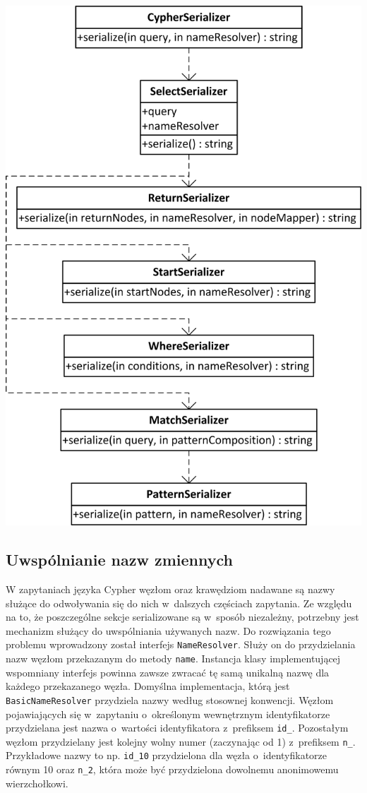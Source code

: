 \documentclass{xmgr}
\begin{document}
\newpage

\begin{center}
	\includegraphics[scale=1]{images/cypher-serialization-uml.png}
\end{center}

\subsection{Uwspólnianie nazw zmiennych}

W zapytaniach języka Cypher węzłom oraz krawędziom nadawane są nazwy służące do odwoływania się do nich w~dalszych częściach zapytania. Ze względu na to, że poszczególne sekcje serializowane są w~sposób niezależny, potrzebny jest mechanizm służący do uwspólniania używanych nazw. Do rozwiązania tego problemu wprowadzony został interfejs \texttt{NameResolver}. Służy on do przydzielania nazw węzłom przekazanym do metody \texttt{name}. Instancja klasy implementującej wspomniany interfejs powinna zawsze zwracać tę samą unikalną nazwę dla każdego przekazanego węzła. Domyślna implementacja, którą jest \texttt{BasicNameResolver} przydziela nazwy według stosownej konwencji. Węzłom pojawiających się w~zapytaniu o~określonym wewnętrznym identyfikatorze przydzielana jest nazwa o~wartości identyfikatora z~prefiksem \texttt{id\_}. Pozostałym węzłom przydzielany jest kolejny wolny numer (zaczynając od 1) z~prefiksem \texttt{n\_}. Przykładowe nazwy to np. \texttt{id\_10} przydzielona dla węzła o~identyfikatorze równym 10 oraz \texttt{n\_2}, która może być przydzielona dowolnemu anonimowemu wierzchołkowi.
\end{document}
